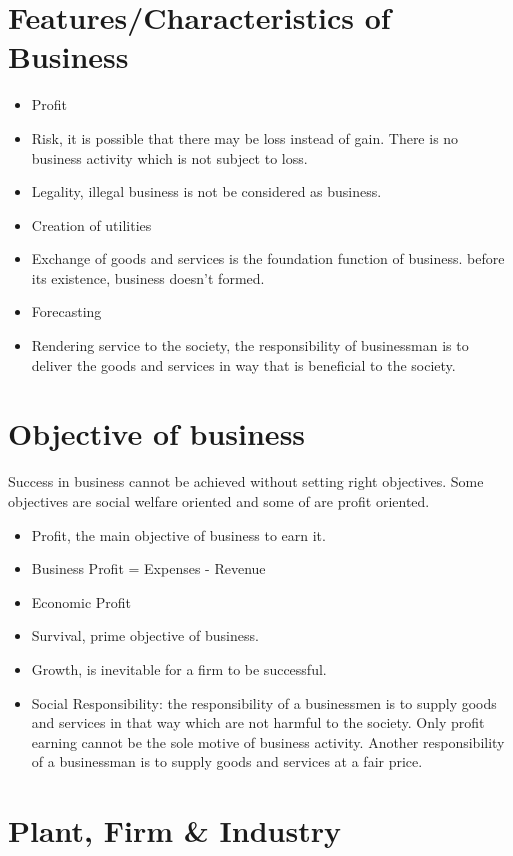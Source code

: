 \documentclass[11pt]{book}
\begin{document}
\section{Features/Characteristics of Business}
\begin{itemize}[label={$\blacksquare$}]
	\item Profit
	\item Risk, it is possible that there may be loss instead of gain. There is no business activity which is not subject to loss.
	\item Legality, illegal business is not be considered as business.
	\item Creation of utilities
	\item Exchange of goods and services is the foundation function of business. before its existence, business doesn't formed.
	\item Forecasting
	\item Rendering service to the society, the responsibility of businessman is to deliver the goods and services in way that is beneficial to the society.
\end{itemize}

\section{Objective of business}
Success in business cannot be achieved without setting right objectives. Some objectives are social welfare oriented and some of are profit oriented.
\begin{itemize}
	\item Profit, the main objective of business to earn it.
	\item Business Profit = Expenses - Revenue
	\item Economic Profit
	\item Survival, prime objective of business.
	\item Growth, is inevitable for a firm to be successful.
	\item Social Responsibility: the responsibility of a businessmen is to supply goods and services in that way which are not harmful to the society. Only profit earning cannot be the sole motive of business activity. Another responsibility of a businessman is to supply goods and services at a fair price.
\end{itemize}

\section{Plant, Firm \& Industry}
\end{document}
